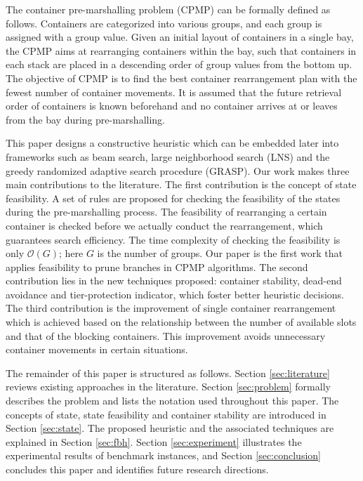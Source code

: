 \documentclass[review,3p,times,12pt,number]{elsarticle}\usepackage{amsmath}\usepackage{amssymb}
\begin{document}
The container pre-marshalling problem (CPMP) can be formally defined as follows. Containers are categorized into various groups, and each group is assigned with a group value. Given an initial layout of containers in a single bay, the CPMP aims at rearranging containers within the bay, such that containers in each stack are placed in a descending order of group values from the bottom up.
The objective of CPMP is to find the best container rearrangement plan with the fewest number of container movements.
It is assumed that the future retrieval order of containers is known beforehand and no container arrives at or leaves from the bay during pre-marshalling.

This paper designs a constructive heuristic which can be embedded later into frameworks such as beam search, large neighborhood search (LNS) and the greedy randomized adaptive search procedure (GRASP).
Our work makes three main contributions to the literature.
The first contribution is the concept of state feasibility. A set of rules are proposed for checking the feasibility of the states during the pre-marshalling process.
The feasibility of rearranging a certain container is checked before we actually conduct the rearrangement, which guarantees search efficiency.
The time complexity of checking the feasibility is only $\mathcal O(G)$; here $G$ is the number of groups. Our paper is the first work that applies feasibility to prune branches in CPMP algorithms.
The second contribution lies in the new techniques proposed: container stability, dead-end avoidance and tier-protection indicator, which foster better heuristic decisions.
The third contribution is the improvement of single container rearrangement which is achieved based on the relationship between the number of available slots and that of the blocking containers. This improvement avoids unnecessary container movements in certain situations.

The remainder of this paper is structured as follows. Section \ref{sec:literature} reviews existing approaches in the literature. Section \ref{sec:problem} formally describes the problem and lists the notation used throughout this paper. The concepts of state, state feasibility and container stability are introduced in Section \ref{sec:state}.
The proposed heuristic and the associated techniques are explained in Section \ref{sec:fbh}. Section \ref{sec:experiment} illustrates the experimental results of benchmark instances, and Section \ref{sec:conclusion} concludes this paper and identifies future research directions.
\end{document}
